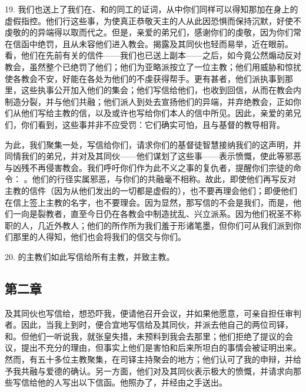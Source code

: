 19. 我们也送上了我们在、和的同工的证词，从中你们同样可以得知那加在身上的虚假指控。他们行这些事，为使真正恭敬天主的人从此因恐惧而保持沉默，好使不虔敬的的异端得以取而代之。但是，亲爱的弟兄们，感谢你们的虔敬，因为你们常在信函中绝罚，且从未容他们进入教会。揭露及其同伙也轻而易举，近在眼前。看，他们在先前有关的信件——我们也已送上副本——之后，如今竟公然煽动反对教会，虽然整个已绝罚了他们；他们为亚略派按立了一位主教；他们用威胁和惊扰使各教会不安，好能在各处为他们的不虔获得帮手。更有甚者，他们派执事到那里，这些执事公开加入他们的集会；他们写信给他们，也收到回信，从而在教会内制造分裂，并与他们共融；他们派人到处去宣扬他们的异端，并弃绝教会，正如你们从他们写给主教的信，以及或许也写给你们本人的信中所见。因此，亲爱的弟兄们，你们看到，这些事并非不应受罚：它们确实可怕，且与基督的教导相背。\par

为此，我们聚集一处，写信给你们，请求你们的基督徒智慧接纳我们的这声明，并同情我们的弟兄，并对及其同伙——他们谋划了这些事——表示愤慨，使此等邪恶与凶残不再侵害教会。我们呼吁你们作为此不义之事的复仇者，提醒你们宗徒的命令： 。他们的行径实属邪恶，与你们的共融毫不相称。故此，即使他们再写反对主教的信件（因为从他们发出的一切都是虚假的），也不要再理会他们；即便他们在信上签上主教的名字，也不要理会。因为显然，那写信的不会是我们，而是，他们一向是裂教者，直至今日仍在各教会中制造扰乱、兴立派系。因为他们祝圣不称职的人，几近外教人；他们的所作所为我们羞于形诸笔墨，但你们可从我们派到你们那里的人得知，他们也会将我们的信交与你们。\par

20. 的主教们如此写信给所有主教，并致主教。\par


\subsection{第二章 }

及其同伙也写信给，想恐吓我，便请他召开会议，并如果他愿意，可亲自担任审判者。因此，当我上到时，便合宜地写信给及其同伙，并派去他自己的两位司铎，和。但他们一听说我，就张皇失措，未预料到我会去那里；他们拒绝了提议的会议，提出不充分的理由，但事实上他们是害怕和后来所坦白的事情会被证明出来。然而，有五十多位主教聚集，在司铎主持聚会的地方；他们认可了我的申辩，并给予我共融与爱德的确认。另一方面，他们对及其同伙表示极大的愤慨，并请求向那些写信给他的人写出以下信函。他照办了，并经由之手送出。\par

